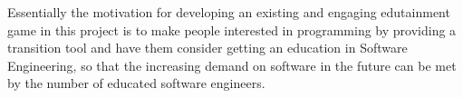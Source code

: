 Essentially the motivation for developing an existing and engaging edutainment game in this project is to make people interested in programming by providing a transition tool and have them consider getting an education in Software Engineering, so that the increasing demand on software in the future can be met by the number of educated software engineers.\citep{idaArtikelMangel}